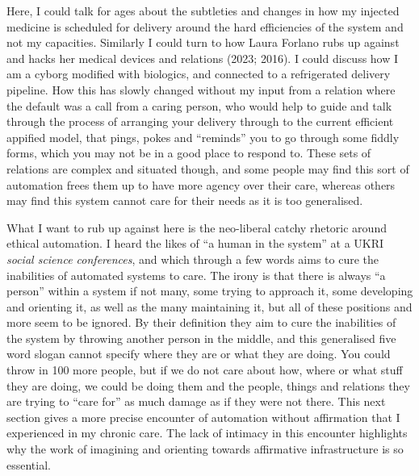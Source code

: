 Here, I could talk for ages about the subtleties and changes in how my
injected medicine is scheduled for delivery around the hard efficiencies
of the system and not my capacities. Similarly I could turn to how Laura
Forlano rubs up against and hacks her medical devices and relations
(2023; 2016). I could discuss how I am a cyborg modified with biologics,
and connected to a refrigerated delivery pipeline. How this has slowly
changed without my input from a relation where the default was a call
from a caring person, who would help to guide and talk through the
process of arranging your delivery through to the current efficient
appified model, that pings, pokes and ``reminds'' you to go through some
fiddly forms, which you may not be in a good place to respond to. These
sets of relations are complex and situated though, and some people may
find this sort of automation frees them up to have more agency over
their care, whereas others may find this system cannot care for their
needs as it is too generalised.

What I want to rub up against here is the neo-liberal catchy rhetoric
around ethical automation. I heard the likes of ``a human in the
system'' at a UKRI \emph{social science conferences}, and which through
a few words aims to cure the inabilities of automated systems to care.
The irony is that there is always ``a person'' within a system if not
many, some trying to approach it, some developing and orienting it, as
well as the many maintaining it, but all of these positions and more
seem to be ignored. By their definition they aim to cure the inabilities
of the system by throwing another person in the middle, and this
generalised five word slogan cannot specify where they are or what they
are doing. You could throw in 100 more people, but if we do not care
about how, where or what stuff they are doing, we could be doing them
and the people, things and relations they are trying to ``care for'' as
much damage as if they were not there. This next section gives a more
precise encounter of automation without affirmation that I experienced
in my chronic care. The lack of intimacy in this encounter highlights
why the work of imagining and orienting towards affirmative
infrastructure is so essential.

